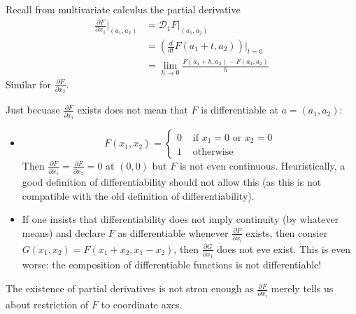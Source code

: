 \documentclass[a4paper]{article}
\newcommand*{\D}{\mathcal{D}}
\theoremstyle{definition}
\begin{document}
Recall from multivariate calculus the partial derivative
\begin{align*}
  \frac{\partial F}{\partial x_1} \Big|_{(a_1, a_2)} &= \D_1 F|_{(a_1, a_2)} \\
                                                     &= \left( \frac{d}{dt} F(a_1 + t, a_2) \right) \big|_{t = 0} \\
                                                     &= \lim_{h \to 0} \frac{F(a_1 + h, a_2) - F(a_1, a_2)}{h}
\end{align*}
Similar for \(\frac{\partial F}{\partial x_2}\).

\begin{note}
  Just becuase \(\frac{\partial F}{\partial x_i}\) exists does not mean that \(F\) is differentiable at \(a = (a_1, a_2)\):

  \begin{eg}\leavevmode
    \begin{itemize}
    \item \[
      F(x_1, x_2) =
      \begin{cases}
        0 & \text{ if } x_1 = 0 \text{ or } x_2 = 0 \\
        1 & \text{ otherwise}
      \end{cases}
    \]
    Then \(\frac{\partial F}{\partial x_1} = \frac{\partial F}{\partial x_2} = 0\) at \((0, 0)\) but \(F\) is not even continuous. Heuristically, a good definition of differentiability should not allow this (as this is not compatible with the old definition of differentiability).
  \item If one insists that differentiability does not imply continuity (by whatever means) and declare \(F\) as differentiable whenever \(\frac{\partial F}{\partial x_i}\) exists, then consier \(G(x_1, x_2) = F(x_1 + x_2, x_1 - x_2)\), then \(\frac{\partial G}{\partial x_1}\) does not eve exist. This is even worse: the composition of differentiable functions is not differentiable!
  \end{itemize}
  \end{eg}
\end{note}

The existence of partial derivatives is not stron enough as \(\frac{\partial F}{\partial x_i}\) merely tells us about restriction of \(F\) to coordinate axes.
\end{document}
